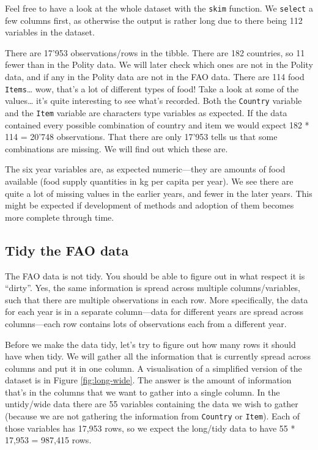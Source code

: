 \documentclass[]{book}
\newenvironment{Shaded}{\begin{snugshade}}{\end{snugshade}}
\newcommand{\CommentTok}[1]{\textcolor[rgb]{0.56,0.35,0.01}{\textit{#1}}}
\begin{document}
Feel free to have a look at the whole dataset with the \texttt{skim} function. We \texttt{select} a few columns first, as otherwise the output is rather long due to there being 112 variables in the dataset.

\begin{Shaded}
\end{Shaded}

There are 17'953 observations/rows in the tibble. There are 182 countries, so 11 fewer than in the Polity data. We will later check which ones are not in the Polity data, and if any in the Polity data are not in the FAO data. There are 114 food \texttt{Items}\ldots{} wow, that's a lot of different types of food! Take a look at some of the values\ldots{} it's quite interesting to see what's recorded. Both the \texttt{Country} variable and the \texttt{Item} variable are characters type variables as expected. If the data contained every possible combination of country and item we would expect 182 * 114 = 20'748 observations. That there are only 17'953 tells us that some combinations are missing. We will find out which these are.

The six year variables are, as expected numeric---they are amounts of food available (food supply quantities in kg per capita per year). We see there are quite a lot of missing values in the earlier years, and fewer in the later years. This might be expected if development of methods and adoption of them becomes more complete through time.

\hypertarget{tidying-FAO}{%
\subsection{Tidy the FAO data}\label{tidying-FAO}}

The FAO data is not tidy. You should be able to figure out in what respect it is ``dirty''. Yes, the same information is spread across multiple columns/variables, such that there are multiple observations in each row. More specifically, the data for each year is in a separate column---data for different years are spread across columns---each row contains lots of observations each from a different year.

Before we make the data tidy, let's try to figure out how many rows it should have when tidy. We will gather all the information that is currently spread across columns and put it in one column. A visualisation of a simplified version of the dataset is in Figure \ref{fig:long-wide}. The answer is the amount of information that's in the columns that we want to gather into a single column. In the untidy/wide data there are 55 variables containing the data we wish to gather (because we are not gathering the information from \texttt{Country} or \texttt{Item}). Each of those variables has 17,953 rows, so we expect the long/tidy data to have 55 * 17,953 = 987,415 rows.
\end{document}
